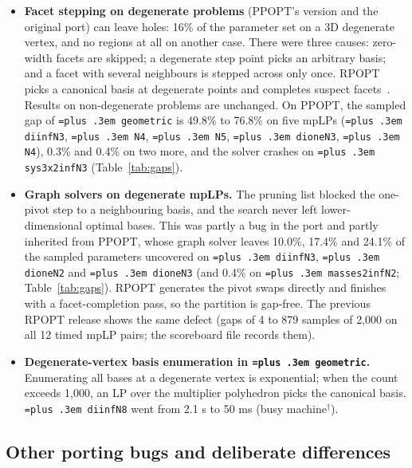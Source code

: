 \documentclass[10pt,a4paper]{article}
\newcommand{\busy}{$^\dagger$}
\newcommand{\rpopt}{RPOPT}
\newcommand{\ppopt}{PPOPT}
\newcommand{\code}[1]{{\let\_\bu\texttt{\spaceskip=\fontdimen2\font plus .3em #1}}}
\newcommand{\bu}{\textunderscore\hspace{0pt}}
\begin{document}
\begin{itemize}
  \item \textbf{Facet stepping on degenerate problems} (\ppopt{}'s version and the original port) can leave holes: 16\% of the parameter set on a 3D degenerate vertex, and no regions at
    all on another case. There were three causes: zero-width facets are skipped; a degenerate step point picks an arbitrary basis; and a facet with several neighbours is stepped across only
    once. \rpopt{} picks a canonical basis at degenerate points and completes suspect facets~\cite{spjotvold2006facet}. Results on non-degenerate problems are unchanged. On \ppopt{}, the sampled gap of
    \code{geometric} is 49.8\% to 76.8\% on five mpLPs (\code{diinf\_N3}, \code{N4}, \code{N5}, \code{dione\_N3}, \code{N4}), 0.3\% and 0.4\% on two more, and the solver crashes on \code{sys3x2inf\_N3} (Table~\ref{tab:gaps}).
  \item \textbf{Graph solvers on degenerate mpLPs.} The pruning list blocked the one-pivot step to a neighbouring basis, and the search never left lower-dimensional optimal bases. This was partly a
    bug in the port and partly inherited from \ppopt{}, whose graph solver leaves 10.0\%, 17.4\% and 24.1\% of the sampled parameters uncovered on \code{diinf\_N3}, \code{dione\_N2} and \code{dione\_N3} (and 0.4\% on \code{masses2inf\_N2}; Table~\ref{tab:gaps}).
    \rpopt{} generates the pivot swaps directly and finishes with a facet-completion pass, so the partition is gap-free. The previous \rpopt{} release shows the same
    defect (gaps of 4 to 879 samples of 2,000 on all 12 timed mpLP pairs; the scoreboard file records them).
  \item \textbf{Degenerate-vertex basis enumeration in \code{geometric}.} Enumerating all bases at a degenerate vertex is exponential; when the count exceeds 1,000, an LP over the multiplier polyhedron picks the canonical basis. \code{diinf\_N8} went from 2.1 s to 50 ms
    (busy machine\busy{}).
\end{itemize}

\subsection{Other porting bugs and deliberate differences}
\end{document}
